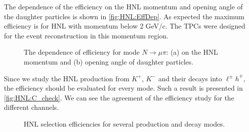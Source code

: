 \documentclass[../main.tex]{subfiles}
\begin{document}
The dependence of the efficiency on the HNL momentum and opening angle of the daughter particles is shown in \autoref{fig:HNL:EffDep}. As expected the maximum efficiency is for HNL with momentum below 2 GeV/c. The TPCs were designed for the event reconstruction in this momentum region.
\begin{figure}[!ht]
  \begin{minipage}{0.49\linewidth}
  \end{minipage}
  \hfill
  \begin{minipage}{0.49\linewidth}
  \end{minipage}
  \caption{The dependence of efficiency for mode $N\to\mu\pi$: (a) on the HNL momentum and (b) opening angle of daughter particles.}
  \label{fig:HNL:EffDep}
\end{figure}

Since we study the HNL production from $K^+$,  $K^-$ and their decays into $\ell^{\pm}h^{\mp}$, the efficiency should be evaluated for every mode. Such a result is presented in \autoref{fig:HNL:C_check}. We can see the agreement of the efficiency study for the different channels.

\begin{figure}[!ht]
  \begin{minipage}{0.49\linewidth}
  \end{minipage}
  \hfill
  \begin{minipage}{0.49\linewidth}
  \end{minipage}
  \caption{HNL selection efficiencies for several production and decay modes.}
  \label{fig:HNL:C_check}
\end{figure}
\end{document}
